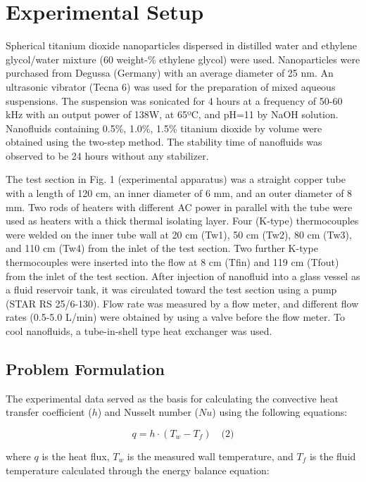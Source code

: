 \documentclass{article}
\begin{document}
\section{Experimental Setup}
Spherical titanium dioxide nanoparticles dispersed in distilled water and ethylene glycol/water mixture (60 weight-\% ethylene glycol) were used. Nanoparticles were purchased from Degussa (Germany) with an average diameter of 25 nm. An ultrasonic vibrator (Tecna 6) was used for the preparation of mixed aqueous suspensions. The suspension was sonicated for 4 hours at a frequency of 50-60 kHz with an output power of 138W, at 65ºC, and pH=11 by NaOH solution. Nanofluids containing 0.5\%, 1.0\%, 1.5\% titanium dioxide by volume were obtained using the two-step method. The stability time of nanofluids was observed to be 24 hours without any stabilizer.

The test section in Fig. 1 (experimental apparatus) was a straight copper tube with a length of 120 cm, an inner diameter of 6 mm, and an outer diameter of 8 mm. Two rods of heaters with different AC power in parallel with the tube were used as heaters with a thick thermal isolating layer. Four (K-type) thermocouples were welded on the inner tube wall at 20 cm (Tw1), 50 cm (Tw2), 80 cm (Tw3), and 110 cm (Tw4) from the inlet of the test section. Two further K-type thermocouples were inserted into the flow at 8 cm (Tfin) and 119 cm (Tfout) from the inlet of the test section. After injection of nanofluid into a glass vessel as a fluid reservoir tank, it was circulated toward the test section using a pump (STAR RS 25/6-130). Flow rate was measured by a flow meter, and different flow rates (0.5-5.0 L/min) were obtained by using a valve before the flow meter. To cool nanofluids, a tube-in-shell type heat exchanger was used.



\subsection{Problem Formulation}
The experimental data served as the basis for calculating the convective heat transfer coefficient ($h$) and Nusselt number ($Nu$) using the following equations:

\begin{equation}
q = h \cdot (T_w - T_f) \quad \text{(2)}
\end{equation}

where $q$ is the heat flux, $T_w$ is the measured wall temperature, and $T_f$ is the fluid temperature calculated through the energy balance equation:
\end{document}
